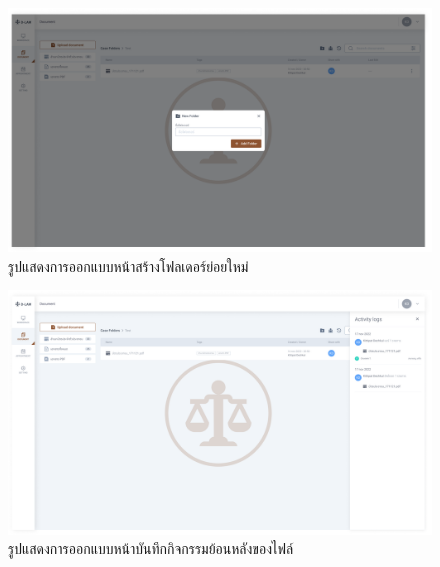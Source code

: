 \documentclass[12pt,oneside,openright,a4paper]{cpe-thai-project}
\begin{document}
\begin{figure}[!h]\centering
  \includegraphics[width=16cm]{./assets/userinterface/create-new-folder.png}
  \caption{รูปแสดงการออกแบบหน้าสร้างโฟลเดอร์ย่อยใหม่}\label{fig:create-new-folder}
\end{figure}

\begin{figure}[!h]\centering
  \includegraphics[width=16cm]{./assets/userinterface/activity-logs.png}
  \caption{รูปแสดงการออกแบบหน้าบันทึกกิจกรรมย้อนหลังของไฟล์}\label{fig:activity-logs}
\end{figure}

\newpage
\end{document}
